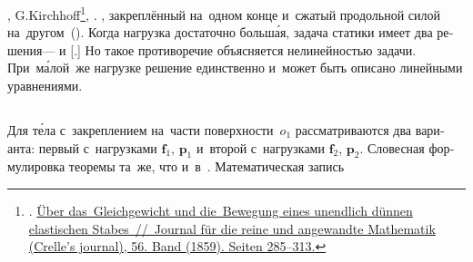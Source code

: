

\begin{otherlanguage}{russian}

,  G.\:Kirchhoff\footnote{. \href{https://opacplus.bsb-muenchen.de/Vta2/bsb10525510/bsb:2960444?page=291}{Über das~Gleich\-gewicht und die~Bewe\-gung eines unendlich dünnen elastischen Stabes~//~Journal für die reine und angewandte Mathematik (Crelle’s journal), 56. Band (1859). Seiten 285\hbox{--}313.}}\hbox{\hspace{-0.5ex},} .
 , закреплённый на~одном конце и~сжатый продольной силой на~другом~(). Когда нагрузка достаточно больш\'{а}я, задача статики имеет два решения\:---  и [.]
Но такое противоречие объясняется нелинейностью задачи. При~м\'{а}лой~же нагрузке решение единственно и~может быть описано линейными уравнениями.

\subsection*{}

Для т\'{е}ла с~закреплением на~части поверхности~${o_1}$ рассматриваются два варианта: первый с~нагрузками $\bm{f}_1$, $\bm{p}_1$ и~второй с~нагрузками $\bm{f}_2$, $\bm{p}_2$.
Словесная формулировка теоремы та~же, что и~в~.
Математическая запись


\end{otherlanguage}
